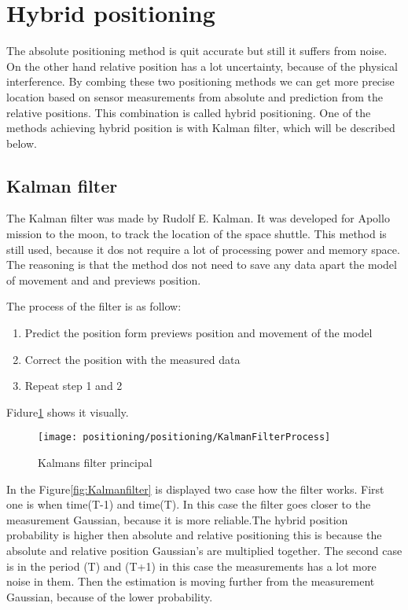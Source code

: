 \section{Hybrid positioning}

The absolute positioning method is quit accurate but still it suffers from noise. On the other hand relative position has a lot uncertainty, because of the physical interference. By combing these two positioning methods we can get more precise location based on sensor measurements from absolute and prediction from the relative positions. This combination is called hybrid positioning. One of the methods achieving hybrid position is with Kalman filter, which will be described below.

\subsection{Kalman filter}

The Kalman filter was made by Rudolf E. Kalman. It was developed for Apollo mission to the moon, to track the location of the space shuttle. This method is still used, because it dos not require a lot of processing power and memory space. The reasoning is that the method dos not need to save any data apart the model of movement and and previews position.

The process of the filter is as follow:
\begin{enumerate}
	\item Predict the position form previews position and movement of the model
	\item Correct the position with the measured data
	\item Repeat step 1 and 2
\end{enumerate}

Fidure\ref{fig:KalmanfilterRotation} shows it visually.

\begin{figure}[H]
	\centering
	\texttt{[image: positioning/positioning/KalmanFilterProcess]}
	\caption{Kalmans filter principal}
	\label{fig:KalmanfilterRotation}
\end{figure}

In the Figure\ref{fig:Kalmanfilter} is displayed two case how the filter works. First one is when time(T-1) and time(T). In this case the filter goes closer to the measurement Gaussian, because it is more reliable.The hybrid position probability is higher then absolute and relative positioning this is because the absolute and relative position Gaussian's are multiplied together. The second case is in the period (T) and (T+1) in this case the measurements has a lot more noise in them. Then the estimation is moving further from the measurement Gaussian, because of the lower probability. 

